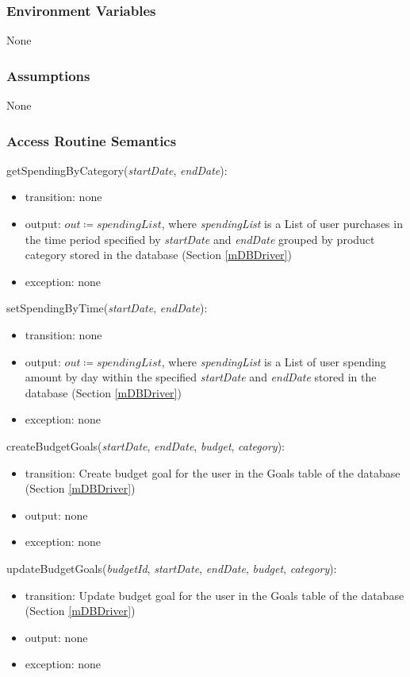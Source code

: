\documentclass[12pt, titlepage]{article}
\begin{document}
\subsubsection{Environment Variables}
None

\subsubsection{Assumptions}
None

\subsubsection{Access Routine Semantics}

\noindent getSpendingByCategory(\textit{startDate}, \textit{endDate}):
\begin{itemize}
\item transition: none
\item output: \( \textit{out} \coloneqq spendingList \), where \textit{spendingList} is a List of user purchases in the time period specified by \textit{startDate} and \textit{endDate} grouped by product category stored in the database (Section \ref{mDBDriver})
\item exception: none
\end{itemize}

\noindent setSpendingByTime(\textit{startDate}, \textit{endDate}):
\begin{itemize}
\item transition: none
\item output: \( \textit{out} \coloneqq spendingList \), where \textit{spendingList} is a List of user spending amount by day within the specified \textit{startDate} and \textit{endDate} stored in the database (Section \ref{mDBDriver})
\item exception: none
\end{itemize}

\noindent createBudgetGoals(\textit{startDate}, \textit{endDate}, \textit{budget}, \textit{category}):
\begin{itemize}
\item transition: Create budget goal for the user in the Goals table of the database (Section \ref{mDBDriver})
\item output: none
\item exception: none
\end{itemize}

\noindent updateBudgetGoals(\textit{budgetId}, \textit{startDate}, \textit{endDate}, \textit{budget}, \textit{category}):
\begin{itemize}
\item transition: Update budget goal for the user in the Goals table of the database (Section \ref{mDBDriver})
\item output: none
\item exception: none
\end{itemize}
\end{document}

